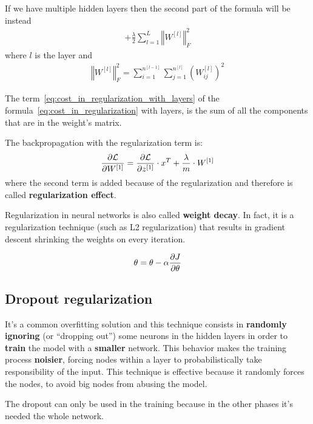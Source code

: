 \documentclass[oneside]{academica}
\begin{document}
If we have multiple hidden layers then the second part of the formula will be instead
\begin{gather}
  + \frac{\lambda}{2} \sum_{l=1}^{L} \left\Vert W^{[l]} \right\Vert_F^2 
  \label{eq:cost_in_regularization_with_layers}
\end{gather}
where $l$ is the layer and
\begin{gather*}
  \left\Vert W^{[l]} \right\Vert_F^2 = \sum_{i=1}^{n^{[l-1]}} \sum_{j=1}^{n^{[l]}} \left( W_{ij}^{[l]} \right)^2
\end{gather*}

The term~\ref{eq:cost_in_regularization_with_layers} of the formula~\ref{eq:cost_in_regularization} with layers, is the sum of all the components that are in the weight's matrix.

The backpropagation with the regularization term is:
\begin{gather*}
  \frac{\partial \mathcal{L}}{\partial W^{[1]}} = \frac{\partial \mathcal{L}}{\partial z^{[1]}} \cdot x^T + \frac{\lambda}{m} \cdot W^{[1]}
\end{gather*}
where the second term is added because of the regularization and therefore is called \textbf{regularization effect}.

Regularization in neural networks is also called \textbf{weight decay}. In fact, it is a regularization technique (such as L2 regularization) that results in gradient descent shrinking the weights on every iteration.

\begin{gather*}
  \theta = \theta - \alpha \frac{\partial J}{\partial \theta}
\end{gather*}

\newpage

\subsection{Dropout regularization}

It's a common overfitting solution and this technique consists in \textbf{randomly ignoring} (or ``dropping out'') some neurons in the hidden layers in order to \textbf{train} the model with a \textbf{smaller} network.
This behavior makes the training process \textbf{noisier}, forcing nodes within a layer to probabilistically take responsibility of the input.
This technique is effective because it randomly forces the nodes, to avoid big nodes from abusing the model.

The dropout can only be used in the training because in the other phases it's needed the whole network.
\end{document}

